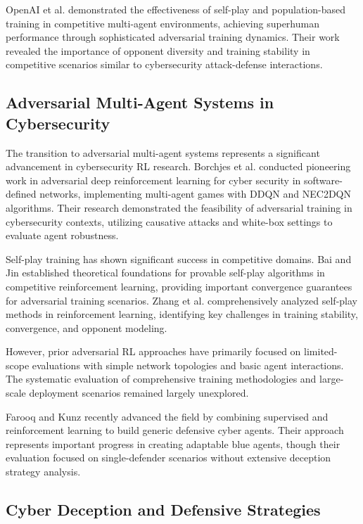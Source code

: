 \documentclass[12pt,oneside]{article}
\begin{document}
OpenAI et al. \cite{openai2019dota} demonstrated the effectiveness of self-play and population-based training in competitive multi-agent environments, achieving superhuman performance through sophisticated adversarial training dynamics. Their work revealed the importance of opponent diversity and training stability in competitive scenarios similar to cybersecurity attack-defense interactions.

\subsection{Adversarial Multi-Agent Systems in Cybersecurity}

The transition to adversarial multi-agent systems represents a significant advancement in cybersecurity RL research. Borchjes et al. \cite{borchjes2023adversarial} conducted pioneering work in adversarial deep reinforcement learning for cyber security in software-defined networks, implementing multi-agent games with DDQN and NEC2DQN algorithms. Their research demonstrated the feasibility of adversarial training in cybersecurity contexts, utilizing causative attacks and white-box settings to evaluate agent robustness.

Self-play training has shown significant success in competitive domains. Bai and Jin \cite{bai2020provable} established theoretical foundations for provable self-play algorithms in competitive reinforcement learning, providing important convergence guarantees for adversarial training scenarios. Zhang et al. \cite{zhang2024survey} comprehensively analyzed self-play methods in reinforcement learning, identifying key challenges in training stability, convergence, and opponent modeling.

However, prior adversarial RL approaches have primarily focused on limited-scope evaluations with simple network topologies and basic agent interactions. The systematic evaluation of comprehensive training methodologies and large-scale deployment scenarios remained largely unexplored.

Farooq and Kunz \cite{farooq2025combining} recently advanced the field by combining supervised and reinforcement learning to build generic defensive cyber agents. Their approach represents important progress in creating adaptable blue agents, though their evaluation focused on single-defender scenarios without extensive deception strategy analysis.

\subsection{Cyber Deception and Defensive Strategies}
\end{document}

